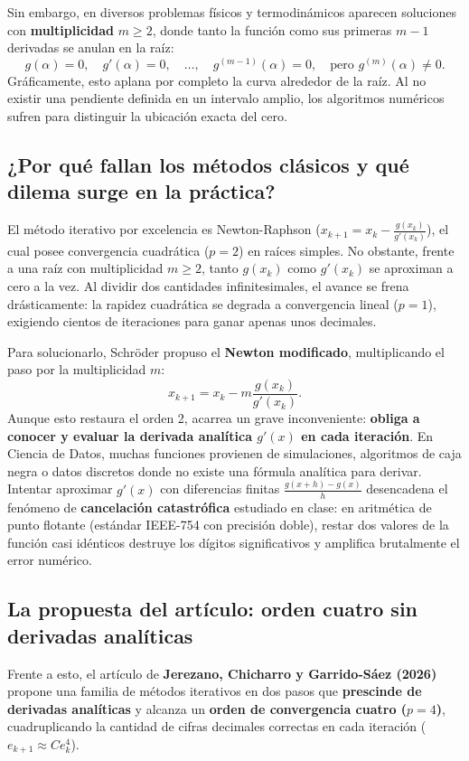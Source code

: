﻿\documentclass[10pt, a4paper]{article}
\begin{document}
Sin embargo, en diversos problemas físicos y termodinámicos aparecen soluciones con \textbf{multiplicidad} $m \ge 2$, donde tanto la función como sus primeras $m-1$ derivadas se anulan en la raíz:
\begin{equation}
    g(\alpha) = 0, \quad g'(\alpha) = 0, \quad \dots, \quad g^{(m-1)}(\alpha) = 0, \quad \text{pero } g^{(m)}(\alpha) \neq 0.
\end{equation}
Gráficamente, esto aplana por completo la curva alrededor de la raíz. Al no existir una pendiente definida en un intervalo amplio, los algoritmos numéricos sufren para distinguir la ubicación exacta del cero.

\subsection{¿Por qué fallan los métodos clásicos y qué dilema surge en la práctica?}
El método iterativo por excelencia es Newton-Raphson ($x_{k+1} = x_k - \frac{g(x_k)}{g'(x_k)}$), el cual posee convergencia cuadrática ($p=2$) en raíces simples. No obstante, frente a una raíz con multiplicidad $m \ge 2$, tanto $g(x_k)$ como $g'(x_k)$ se aproximan a cero a la vez. Al dividir dos cantidades infinitesimales, el avance se frena drásticamente: la rapidez cuadrática se degrada a convergencia lineal ($p=1$), exigiendo cientos de iteraciones para ganar apenas unos decimales.

Para solucionarlo, Schröder propuso el \textbf{Newton modificado}, multiplicando el paso por la multiplicidad $m$:
\begin{equation}
    x_{k+1} = x_k - m \frac{g(x_k)}{g'(x_k)}.
\end{equation}
Aunque esto restaura el orden 2, acarrea un grave inconveniente: \textbf{obliga a conocer y evaluar la derivada analítica $g'(x)$ en cada iteración}. En Ciencia de Datos, muchas funciones provienen de simulaciones, algoritmos de caja negra o datos discretos donde no existe una fórmula analítica para derivar. Intentar aproximar $g'(x)$ con diferencias finitas $\frac{g(x+h)-g(x)}{h}$ desencadena el fenómeno de \textbf{cancelación catastrófica} estudiado en clase: en aritmética de punto flotante (estándar IEEE-754 con precisión doble), restar dos valores de la función casi idénticos destruye los dígitos significativos y amplifica brutalmente el error numérico.

\subsection{La propuesta del artículo: orden cuatro sin derivadas analíticas}
Frente a esto, el artículo de \textbf{Jerezano, Chicharro y Garrido-Sáez (2026)} propone una familia de métodos iterativos en dos pasos que \textbf{prescinde de derivadas analíticas} y alcanza un \textbf{orden de convergencia cuatro ($p=4$)}, cuadruplicando la cantidad de cifras decimales correctas en cada iteración ($e_{k+1} \approx C e_k^4$).
\end{document}
